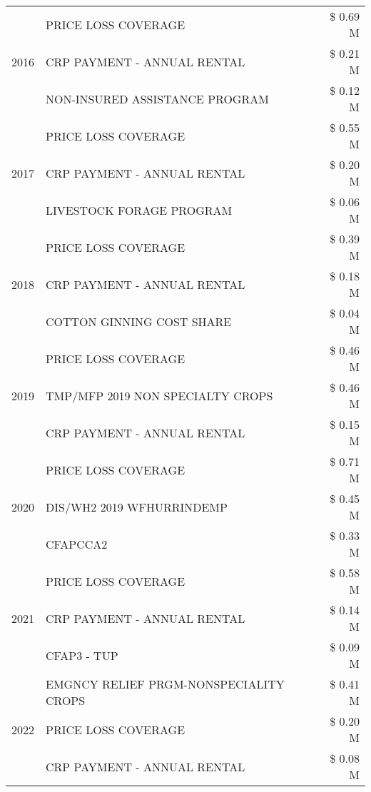 \begin{tabular}{llr}
\cline{1-3}
\multirow[t]{3}{*}{2016} & PRICE LOSS COVERAGE & \$ 0.69 M \\
 & CRP PAYMENT - ANNUAL RENTAL & \$ 0.21 M \\
 & NON-INSURED ASSISTANCE PROGRAM & \$ 0.12 M \\
\cline{1-3}
\multirow[t]{3}{*}{2017} & PRICE LOSS COVERAGE & \$ 0.55 M \\
 & CRP PAYMENT - ANNUAL RENTAL & \$ 0.20 M \\
 & LIVESTOCK FORAGE PROGRAM & \$ 0.06 M \\
\cline{1-3}
\multirow[t]{3}{*}{2018} & PRICE LOSS COVERAGE & \$ 0.39 M \\
 & CRP PAYMENT - ANNUAL RENTAL & \$ 0.18 M \\
 & COTTON GINNING COST SHARE & \$ 0.04 M \\
\cline{1-3}
\multirow[t]{3}{*}{2019} & PRICE LOSS COVERAGE & \$ 0.46 M \\
 & TMP/MFP 2019 NON SPECIALTY CROPS & \$ 0.46 M \\
 & CRP PAYMENT - ANNUAL RENTAL & \$ 0.15 M \\
\cline{1-3}
\multirow[t]{3}{*}{2020} & PRICE LOSS COVERAGE & \$ 0.71 M \\
 & DIS/WH2 2019 WFHURRINDEMP & \$ 0.45 M \\
 & CFAPCCA2 & \$ 0.33 M \\
\cline{1-3}
\multirow[t]{3}{*}{2021} & PRICE LOSS COVERAGE & \$ 0.58 M \\
 & CRP PAYMENT - ANNUAL RENTAL & \$ 0.14 M \\
 & CFAP3 - TUP & \$ 0.09 M \\
\cline{1-3}
\multirow[t]{3}{*}{2022} & EMGNCY RELIEF PRGM-NONSPECIALITY CROPS & \$ 0.41 M \\
 & PRICE LOSS COVERAGE & \$ 0.20 M \\
 & CRP PAYMENT - ANNUAL RENTAL & \$ 0.08 M \\
\cline{1-3}
\bottomrule
\end{tabular}
